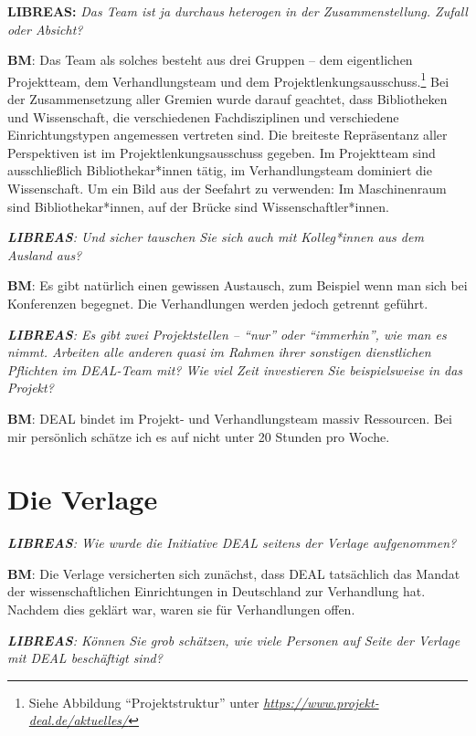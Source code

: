 \documentclass[a4paper,
fontsize=11pt,
oneside,
numbers=noperiodatend,
parskip=half-,
bibliography=totoc,
final
]{scrartcl}
\begin{document}
\textbf{LIBREAS:} \emph{Das Team ist ja durchaus heterogen in der
Zusammenstellung. Zufall oder Absicht?}

\textbf{BM}: Das Team als solches besteht aus drei Gruppen -- dem
eigentlichen Projektteam, dem Verhandlungsteam und dem
Projektlenkungsausschuss.\footnote{Siehe Abbildung
  \enquote{Projektstruktur} unter
  \href{https://www.projekt-deal.de/aktuelles/}{\emph{https://www.projekt-deal.de/aktuelles/}}}
Bei der Zusammensetzung aller Gremien wurde darauf geachtet, dass
Bibliotheken und Wissenschaft, die verschiedenen Fachdisziplinen und
verschiedene Einrichtungstypen angemessen vertreten sind. Die breiteste
Repräsentanz aller Perspektiven ist im Projektlenkungsausschuss gegeben.
Im Projektteam sind ausschließlich Bibliothekar*innen tätig, im
Verhandlungsteam dominiert die Wissenschaft. Um ein Bild aus der
Seefahrt zu verwenden: Im Maschinenraum sind Bibliothekar*innen, auf der
Brücke sind Wissenschaftler*innen.

\emph{\textbf{LIBREAS}: Und sicher tauschen Sie sich auch mit
Kolleg*innen aus dem Ausland aus?}

\textbf{BM}: Es gibt natürlich einen gewissen Austausch, zum Beispiel
wenn man sich bei Konferenzen begegnet. Die Verhandlungen werden jedoch
getrennt geführt.

\emph{\textbf{LIBREAS}: Es gibt zwei Projektstellen -- \enquote{nur}
oder \enquote{immerhin}, wie man es nimmt. Arbeiten alle anderen quasi
im Rahmen ihrer sonstigen dienstlichen Pflichten im DEAL-Team mit? Wie
viel Zeit investieren Sie beispielsweise in das Projekt?}

\textbf{BM}: DEAL bindet im Projekt- und Verhandlungsteam massiv
Ressourcen. Bei mir persönlich schätze ich es auf nicht unter 20 Stunden
pro Woche.

\section{Die Verlage}\label{die-verlage}

\emph{\textbf{LIBREAS}: Wie wurde die Initiative DEAL seitens der
Verlage aufgenommen?}

\textbf{BM}: Die Verlage versicherten sich zunächst, dass DEAL
tatsächlich das Mandat der wissenschaftlichen Einrichtungen in
Deutschland zur Verhandlung hat. Nachdem dies geklärt war, waren sie für
Verhandlungen offen.

\emph{\textbf{LIBREAS}: Können Sie grob schätzen, wie viele Personen auf
Seite der Verlage mit DEAL beschäftigt sind?}
\end{document}
